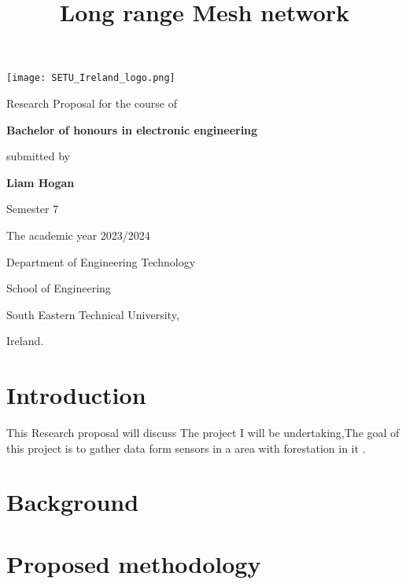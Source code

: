 \documentclass{article}
\begin{document}
\begin{center}
    \texttt{[image: SETU\_Ireland\_logo.png]} \par
    \huge Research Proposal for the course of \par
    \huge \textbf{Bachelor of honours in electronic engineering} \par
    \huge submitted by \par
    \huge \textbf{Liam Hogan} \par
    \par
    Semester 7 \par
    The academic year 2023/2024 \par
    Department of Engineering Technology \par
    School of Engineering \par
    South Eastern Technical University, \par
    Ireland.
\end{center}
\newpage
\tableofcontents
\newpage
\title{Long range Mesh network}
\begin{abstract}
    
\end{abstract}
\section{Introduction}
This Research proposal will discuss The project I will be undertaking,The goal of this project is to  gather data form sensors in a area with forestation in it .
\section{Background}
\section{Proposed methodology}
\end{document}
